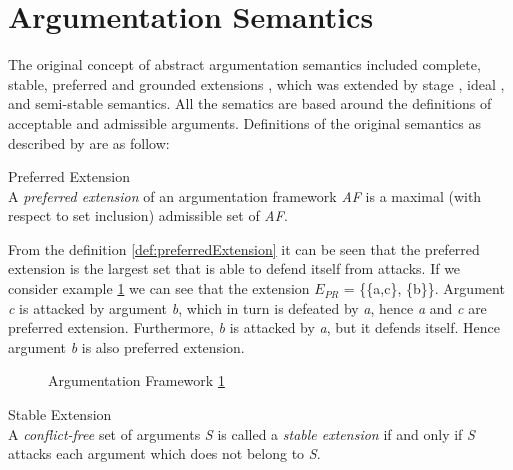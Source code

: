 \section{Argumentation Semantics}
\label{sec:argumentationSemantics}


The original concept of abstract argumentation semantics included complete, stable, preferred and grounded extensions \citep{dung1995}, which was extended by stage \citep{verheij1996two}, ideal \citep{dung2007computing}, and semi-stable \citep{caminada2006semi} semantics. All the sematics are based around the definitions of acceptable and admissible arguments. Definitions of the original semantics as described by \citet{dung1995} are as follow: 

\begin{definition}{Preferred Extension}
\label{def:preferredExtension}\\
A \textit{preferred extension} of an argumentation framework \textit{AF} is a maximal (with respect to set inclusion) admissible set of \textit{AF}.
\end{definition}


From the definition \ref{def:preferredExtension} it can be seen that the preferred extension is the largest set that is able to defend itself from attacks. If we consider example \ref{fig:af1} we can see that the extension \textit{$E_{PR}$} = \{\{a,c\}, \{b\}\}. Argument \textit{c} is attacked by argument \textit{b}, which in turn is defeated by \textit{a}, hence \textit{a} and \textit{c} are preferred extension. Furthermore, \textit{b} is attacked by \textit{a}, but it defends itself. Hence argument \textit{b} is also preferred extension.

\begin{figure}[h]
\centering
{}
\caption{Argumentation Framework \ref{fig:af1}}
\label{fig:af1}
\end{figure}

\begin{definition}{Stable Extension}
\label{def:stableExtension}\\
A \textit{conflict-free} set of arguments \textit{S} is called a \textit{stable extension} if and only if \textit{S} attacks each argument which does not belong to \textit{S}.
\end{definition}

